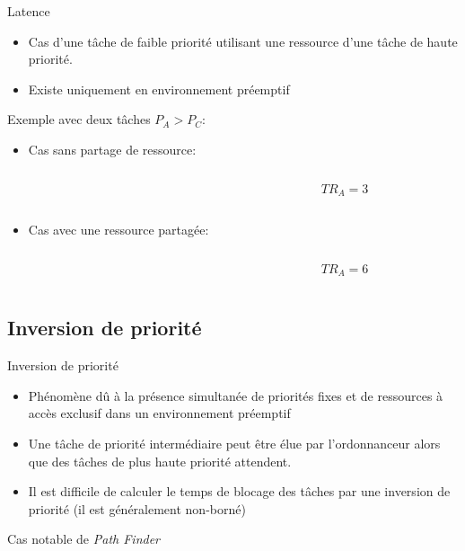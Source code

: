 \begin{frame}{Latence}
  \begin{itemize}
  \item  Cas d'une tâche  de faible  priorité utilisant  une ressource
    d'une tâche de haute priorité.
  \item Existe uniquement en environnement préemptif
  \end{itemize}
  Exemple avec deux tâches $P_A > P_C$:
  \begin{itemize}
  \item Cas sans partage de ressource:
    \begin{columns}
      \begin{column}{6cm}
        \begin{center}
          
        \end{center}
      \end{column}
      \begin{column}{4cm}
        $$TR_A = 3$$
      \end{column}
    \end{columns}
  \item Cas avec une ressource partagée:
    \begin{columns}
      \begin{column}{6cm}
        \begin{center}
          
        \end{center}
      \end{column}
      \begin{column}{4cm}
        $$TR_A = 6$$
      \end{column}
    \end{columns}
  \end{itemize}
\end{frame}

\subsection{Inversion de priorité}

\begin{frame}{Inversion de priorité}
  \begin{itemize}
  \item Phénomène dû à la présence simultanée de priorités fixes et de
    ressources à accès exclusif dans un environnement préemptif
  \item  Une  tâche  de  priorité  intermédiaire peut  être  élue  par
    l'ordonnanceur  alors  que  des  tâches  de  plus  haute  priorité
    attendent.
  \item Il est difficile de calculer  le temps de blocage des tâches par
    une inversion de priorité (il est généralement non-borné)
  \end{itemize}
  Cas notable de \emph{Path Finder}
\end{frame}

